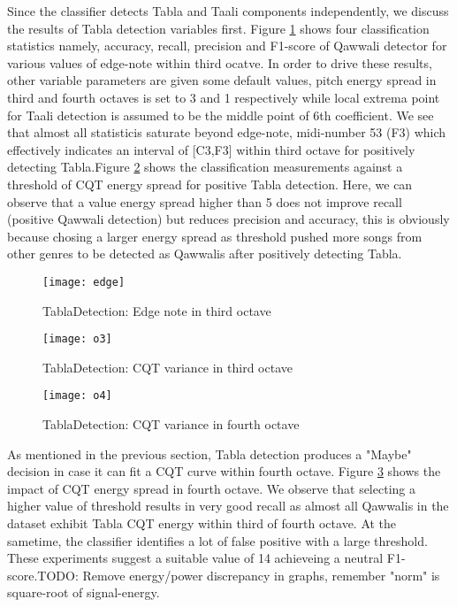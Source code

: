 \documentclass{article}
\begin{document}
Since the classifier detects Tabla and Taali components independently, we discuss the results of Tabla detection variables first. Figure \ref{fig:src_edge} shows four classification statistics namely, accuracy, recall, precision and F1-score of Qawwali detector for various values of edge-note within third ocatve. In order to drive these results, other variable parameters are given some default values, pitch energy spread in third and fourth octaves is set to 3 and 1 respectively while local extrema point for Taali detection is assumed to be the middle point of 6th coefficient.  
We see that almost all statisticis saturate beyond edge-note, midi-number 53 (F3) which effectively indicates an interval of [C3,F3] within third octave for positively detecting Tabla.Figure \ref{fig:src_o3} shows the classification measurements against a threshold of CQT energy spread for positive Tabla detection. Here, we can observe that a value energy spread higher than 5 does not improve recall (positive Qawwali detection) but reduces precision and accuracy, this is obviously because chosing a larger energy spread as threshold pushed more songs from other genres to be detected as Qawwalis after positively detecting Tabla.
\begin{figure}[htbp]
  \centering
  \texttt{[image: edge]}
  \caption{TablaDetection: Edge note in third octave}
\label{fig:src_edge}
\end{figure}
\begin{figure}[htbp]
  \centering
  \texttt{[image: o3]}
  \caption{TablaDetection: CQT variance in third octave}
\label{fig:src_o3}
\end{figure}
\begin{figure}[htbp]
  \centering
  \texttt{[image: o4]}
  \caption{TablaDetection: CQT variance in fourth octave}
\label{fig:src_o4}
\end{figure}
As mentioned in the previous section, Tabla detection produces a "Maybe" decision in case it can fit a CQT curve within fourth octave. Figure \ref{fig:src_o4} shows the impact of CQT energy spread in fourth octave. We observe that selecting a higher value of threshold results in very good recall as almost all Qawwalis in the dataset exhibit Tabla CQT energy within third of fourth octave. At the sametime, the classifier identifies a lot of false positive with a large threshold. These experiments suggest a suitable value of 14 achieveing a neutral F1-score.TODO: Remove energy/power discrepancy in graphs, remember "norm" is square-root of signal-energy.
\end{document}
